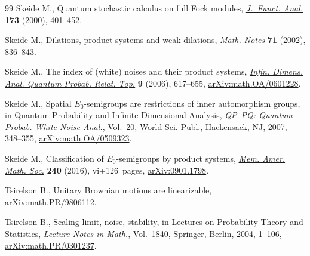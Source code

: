 \documentclass[11pt]{article}
\numberwithin{equation}{section}
\numberwithin{equation}{section}
\begin{document}
\begin{thebibliography}{99}
Skeide M., Quantum stochastic calculus on full {F}ock modules,
 \href{https://doi.org/10.1006/jfan.2000.3579}{\textit{J.~Funct. Anal.}} \textbf{173} (2000), 401--452.

Skeide M., Dilations, product systems and weak dilations, \href{https://doi.org/10.1023/A:1015829130671}{\textit{Math. Notes}}
 \textbf{71} (2002), 836--843.

Skeide M., The index of (white) noises and their product systems,
 \href{https://doi.org/10.1142/S0219025706002573}{\textit{Infin. Dimens. Anal. Quantum Probab. Relat. Top.}} \textbf{9} (2006),
 617--655, \href{https://arxiv.org/abs/math.OA/0601228}{arXiv:math.OA/0601228}.

Skeide M., Spatial {$E_0$}-semigroups are restrictions of inner automorphism
 groups, in Quantum Probability and Infinite Dimensional Analysis,
 \textit{QP--PQ: Quantum Probab. White Noise Anal.}, Vol.~20, \href{https://doi.org/10.1142/9789812770271_0037}{World Sci.
 Publ.}, Hackensack, NJ, 2007, 348--355, \href{https://arxiv.org/abs/math.OA/0509323}{arXiv:math.OA/0509323}.

Skeide M., Classification of {$E_0$}-semigroups by product systems,
 \href{https://doi.org/10.1090/memo/1137}{\textit{Mem. Amer. Math. Soc.}} \textbf{240} (2016), vi+126~pages,
 \href{https://arxiv.org/abs/0901.1798}{arXiv:0901.1798}.

Tsirelson B., Unitary {B}rownian motions are linearizable,
 \href{https://arxiv.org/abs/math.PR/9806112}{arXiv:math.PR/9806112}.

Tsirelson B., Scaling limit, noise, stability, in Lectures on Probability
 Theory and Statistics, \textit{Lecture Notes in Math.}, Vol.~1840, \href{https://doi.org/10.1007/978-3-540-39982-7_1}{Springer},
 Berlin, 2004, 1--106, \href{https://arxiv.org/abs/math.PR/0301237}{arXiv:math.PR/0301237}.

\end{thebibliography}
\end{document}
